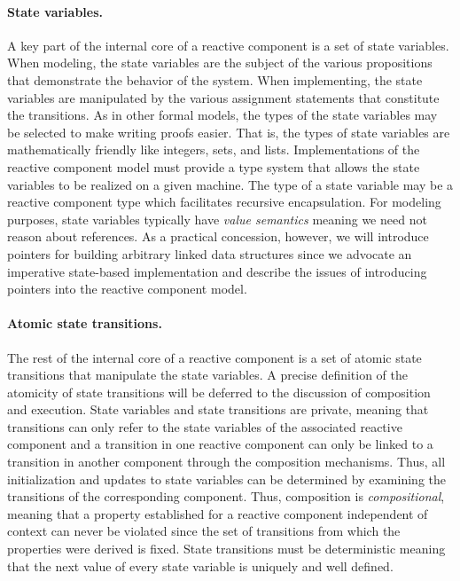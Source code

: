 \paragraph{State variables.}
A key part of the internal core of a reactive component is a set of state variables.
When modeling, the state variables are the subject of the various propositions that demonstrate the behavior of the system.
When implementing, the state variables are manipulated by the various assignment statements that constitute the transitions.
As in other formal models, the types of the state variables may be selected to make writing proofs easier.
That is, the types of state variables are mathematically friendly like integers, sets, and lists.
Implementations of the reactive component model must provide a type system that allows the state variables to be realized on a given machine.
The type of a state variable may be a reactive component type which facilitates recursive encapsulation.
For modeling purposes, state variables typically have \emph{value semantics} meaning we need not reason about references.
As a practical concession, however, we will introduce pointers for building arbitrary linked data structures since we advocate an imperative state-based implementation and describe the issues of introducing pointers into the reactive component model.

\paragraph{Atomic state transitions.}
The rest of the internal core of a reactive component is a set of atomic state transitions that manipulate the state variables.
A precise definition of the atomicity of state transitions will be deferred to the discussion of composition and execution.
State variables and state transitions are private, meaning that transitions can only refer to the state variables of the associated reactive component and a transition in one reactive component can only be linked to a transition in another component through the composition mechanisms.
Thus, all initialization and updates to state variables can be determined by examining the transitions of the corresponding component.
Thus, composition is \emph{compositional}, meaning that a property established for a reactive component independent of context can never be violated since the set of transitions from which the properties were derived is fixed.
State transitions must be deterministic meaning that the next value of every state variable is uniquely and well defined.

